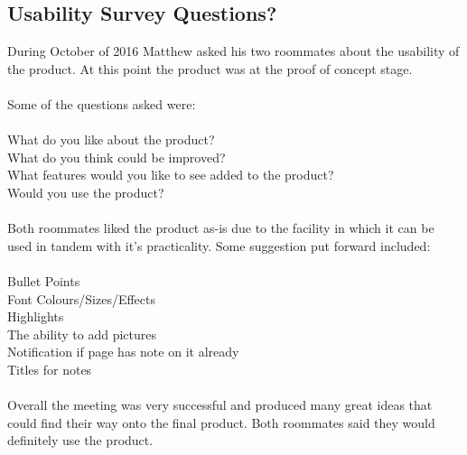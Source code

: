 \documentclass[12pt, titlepage]{article}
\begin{document}
\subsection{Usability Survey Questions?}

During October of 2016 Matthew asked his two roommates about the usability of the 
product. At this point the product was at the proof of concept stage. \\
\\
Some of the questions asked were:\\
\\
What do you like about the product?\\
What do you think could be improved?\\
What features would you like to see added to the product?\\
Would you use the product?\\
\\
Both roommates liked the product as-is due to the facility in which it can be used in 
tandem with it's practicality. Some suggestion put forward included:\\
\\
Bullet Points\\
Font Colours/Sizes/Effects\\
Highlights\\
The ability to add pictures\\
Notification if page has note on it already\\
Titles for notes\\
\\
Overall the meeting was very successful and produced many great ideas that could find 
their way onto the final product. Both roommates said they would definitely use the 
product. 
\end{document}
